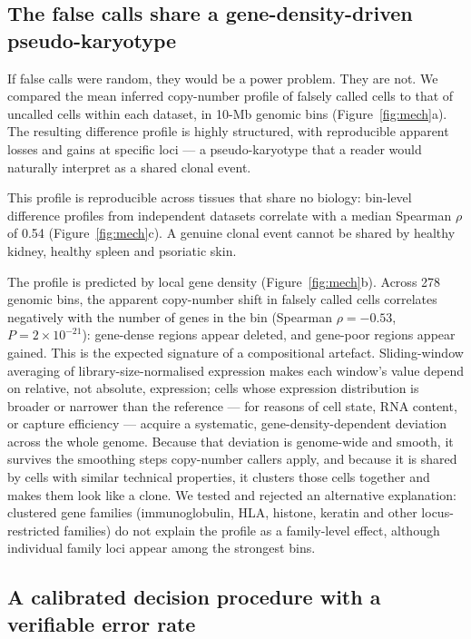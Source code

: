 \documentclass[11pt]{article}
\begin{document}
\subsection{The false calls share a gene-density-driven pseudo-karyotype}

If false calls were random, they would be a power problem. They are not. We
compared the mean inferred copy-number profile of falsely called cells to
that of uncalled cells within each dataset, in 10-Mb genomic bins
(Figure~\ref{fig:mech}a). The resulting difference profile is highly
structured, with reproducible apparent losses and gains at specific loci ---
a pseudo-karyotype that a reader would naturally interpret as a shared clonal
event.

This profile is reproducible across tissues that share no biology: bin-level
difference profiles from independent datasets correlate with a median
Spearman $\rho$ of 0.54 (Figure~\ref{fig:mech}c). A genuine clonal event
cannot be shared by healthy kidney, healthy spleen and psoriatic skin.

The profile is predicted by local gene density (Figure~\ref{fig:mech}b).
Across 278 genomic bins, the apparent copy-number shift in falsely called
cells correlates negatively with the number of genes in the bin (Spearman
$\rho = -0.53$, $P = 2\times10^{-21}$): gene-dense regions appear deleted,
and gene-poor regions appear gained. This is the expected signature of a
compositional artefact. Sliding-window averaging of library-size-normalised
expression makes each window's value depend on relative, not absolute,
expression; cells whose expression distribution is broader or narrower than
the reference --- for reasons of cell state, RNA content, or capture
efficiency --- acquire a systematic, gene-density-dependent deviation across
the whole genome. Because that deviation is genome-wide and smooth, it
survives the smoothing steps copy-number callers apply, and because it is
shared by cells with similar technical properties, it clusters those cells
together and makes them look like a clone. We tested and rejected an
alternative explanation: clustered gene families (immunoglobulin, HLA,
histone, keratin and other locus-restricted families) do not explain the
profile as a family-level effect, although individual family loci appear
among the strongest bins.

\subsection{A calibrated decision procedure with a verifiable error rate}
\end{document}

